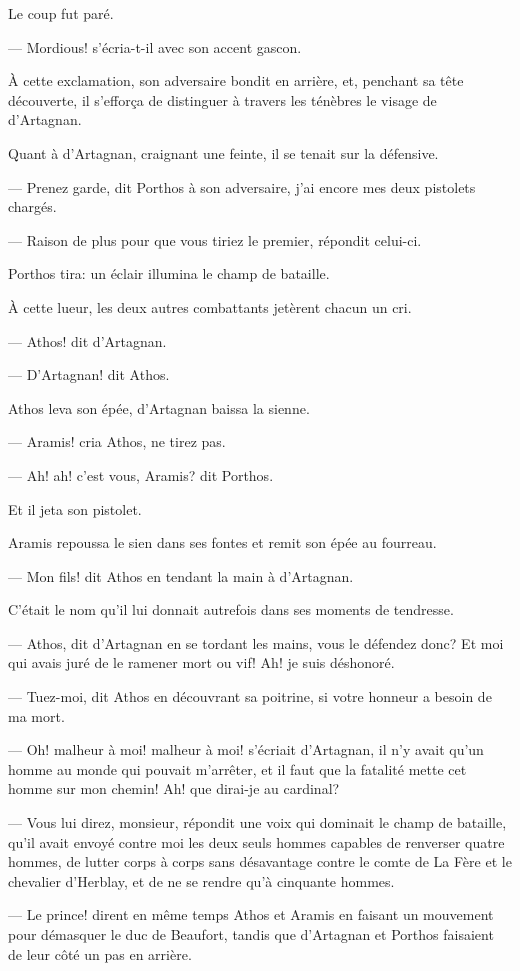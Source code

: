 Le coup fut paré.

— Mordious! s'écria-t-il avec son accent gascon.

À cette exclamation, son adversaire bondit en arrière, et, penchant sa tête découverte, il s'efforça de distinguer à travers les ténèbres le visage de d'Artagnan.

Quant à d'Artagnan, craignant une feinte, il se tenait sur la défensive.

— Prenez garde, dit Porthos à son adversaire, j'ai encore mes deux pistolets chargés.

— Raison de plus pour que vous tiriez le premier, répondit celui-ci.

Porthos tira: un éclair illumina le champ de bataille.

À cette lueur, les deux autres combattants jetèrent chacun un cri.

— Athos! dit d'Artagnan.

— D'Artagnan! dit Athos.

Athos leva son épée, d'Artagnan baissa la sienne.

— Aramis! cria Athos, ne tirez pas.

— Ah! ah! c'est vous, Aramis? dit Porthos.

Et il jeta son pistolet.

Aramis repoussa le sien dans ses fontes et remit son épée au fourreau.

— Mon fils! dit Athos en tendant la main à d'Artagnan.

C'était le nom qu'il lui donnait autrefois dans ses moments de tendresse.

— Athos, dit d'Artagnan en se tordant les mains, vous le défendez donc? Et moi qui avais juré de le ramener mort ou vif! Ah! je suis déshonoré.

— Tuez-moi, dit Athos en découvrant sa poitrine, si votre honneur a besoin de ma mort.

— Oh! malheur à moi! malheur à moi! s'écriait d'Artagnan, il n'y avait qu'un homme au monde qui pouvait m'arrêter, et il faut que la fatalité mette cet homme sur mon chemin! Ah! que dirai-je au cardinal?

— Vous lui direz, monsieur, répondit une voix qui dominait le champ de bataille, qu'il avait envoyé contre moi les deux seuls hommes capables de renverser quatre hommes, de lutter corps à corps sans désavantage contre le comte de La Fère et le chevalier d'Herblay, et de ne se rendre qu'à cinquante hommes.

— Le prince! dirent en même temps Athos et Aramis en faisant un mouvement pour démasquer le duc de Beaufort, tandis que d'Artagnan et Porthos faisaient de leur côté un pas en arrière.

